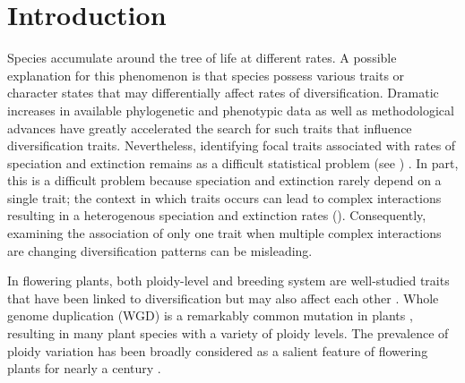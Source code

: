 \section{Introduction}


Species accumulate around the tree of life at different rates.
A possible explanation for this phenomenon is that species possess various traits or character states that may differentially affect rates of diversification. %
Dramatic increases in available phylogenetic and phenotypic data %
as well as methodological advances %
have greatly accelerated the search for such traits that influence diversification traits. Nevertheless, identifying focal traits associated with rates of speciation and extinction remains as a difficult statistical problem (see \citep{maddison_2015, rabosky_2015, moore_2016, fitzjohn_2009, goldberg_2012, beaulieu_2016, rabosky_2017}) . %
In part, this is a difficult problem because speciation and extinction rarely depend on a single trait; the context  in which traits occurs can lead to complex interactions resulting in a heterogenous speciation and extinction rates (\citep{beaulieu_2016, caetano_2018, herrera_2018}). Consequently, examining the association of only one trait when multiple complex interactions are changing diversification patterns can be misleading.

In flowering plants, both ploidy-level and breeding system are well-studied traits that have been linked to diversification but may also affect each other \citep{stebbins1950}. 
Whole genome duplication (WGD) is a remarkably common mutation in plants \citep{husband_2013, zenilferguson_2017}, resulting in many plant species with a variety of ploidy levels. The prevalence of ploidy variation has been broadly considered as a salient feature of flowering plants for nearly a century \citep{stebbins1938}. 

